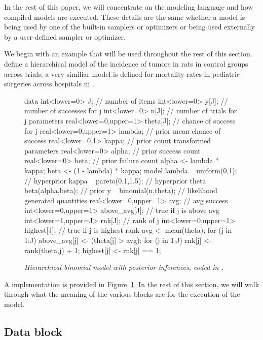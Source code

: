 \documentclass[article]{jss}
\begin{document}
In the rest of this paper, we will concentrate on the modeling
language and how compiled models are executed.  These details are the
same whether a  model is being used by one of the
built-in samplers or optimizers or being used externally by a
user-defined sampler or optimizer.   

We begin with an example that will be used throughout the rest of this
section.  \cite[Section 5.1]{GelmanEtAl:2013} define a hierarchical
model of the incidence of tumors in rats in control groups across
trials; a very similiar model is defined for mortality rates in
pediatric surgeries across hospitals in \citep[Examples, Volume
1]{LunnEtAl:2000,LunnEtAl:2009}.
%  
\begin{figure}
\begin{Code}
data {
  int<lower=0> J;                         // number of items
  int<lower=0> y[J];                      // number of successes for j
  int<lower=0> n[J];                      // number of trials for j
}
parameters {
  real<lower=0,upper=1> theta[J];        // chance of success for j
  real<lower=0,upper=1> lambda;          // prior mean chance of success
  real<lower=0.1> kappa;                 // prior count
}
transformed parameters {
  real<lower=0> alpha;                   // prior success count
  real<lower=0> beta;                    // prior failure count
  alpha <- lambda * kappa;
  beta <- (1 - lambda) * kappa;
}
model {
  lambda ~ uniform(0,1);                 // hyperprior
  kappa ~ pareto(0.1,1.5);               // hyperprior 
  theta ~ beta(alpha,beta);              // prior
  y ~ binomial(n,theta);                 // likelihood
}
generated quantities {
  real<lower=0,upper=1> avg;             // avg success
  int<lower=0,upper=1> above_avg[J];     // true if j is above avg
  int<lower=1,upper=J> rnk[J];           // rank of j
  int<lower=0,upper=1> highest[J];          // true if j is highest rank
  avg <- mean(theta);
  for (j in 1:J)
    above_avg[j] <- (theta[j] > avg);
  for (j in 1:J) {
    rnk[j] <- rank(theta,j) + 1;
    highest[j] <- rnk[j] == 1;
  }
}
\end{Code}
  \caption{\it Hierarchical binomial model with posterior inferences,
    coded in .}\label{hier-binom.fig}
\end{figure}
%
A  implementation is provided in
Figure~\ref{hier-binom.fig}.  In the rest of this section, we will
walk through what the meaning of the various blocks are for the
execution of the model.

\subsection{Data block}
\end{document}
